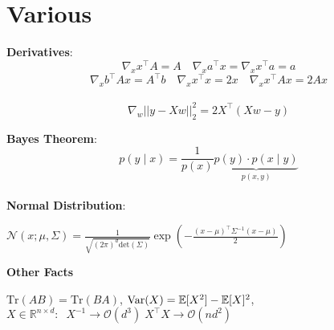 \section*{Various}

\textbf{Derivatives}:
$$\nabla_x x^\top A = A \quad \nabla_x a^\top x = \nabla_x x^\top a = a$$
$$\nabla_x b^\top A x = A^\top b \quad \nabla_x x^\top x = 2x \quad \nabla_x x^\top A x = 2 Ax$$\\[-20pt]
$$\nabla_w || y-Xw||_2^2 = 2X^\top(Xw-y)$$

\textbf{Bayes Theorem}: \\[-13pt]
$$p(y \; | \; x) = \frac{1}{p(x)} \underbrace{p(y) \cdot p(x \; | \; y)}_{p(x,y)}$$ \\[-23pt]

\textbf{Normal Distribution}:

$\mathcal{N}(x; \mu, \Sigma) = \frac{1}{\sqrt{(2 \pi)^d \text{det}(\Sigma)}} \exp(-\frac{(x - \mu)^\top \Sigma^{-1} (x-\mu)}{2})$

\textbf{Other Facts}

$\text{Tr}(AB) = \text{Tr}(BA)$, $\text{Var}(X) = \mathbb{E}[X^2] - \mathbb{E}[X]^2$, $X \in \mathbb{R}^{n \times d}: \; \; X^{-1} \rightarrow \mathcal{O}(d^3) \; X^\top X \rightarrow \mathcal{O}(nd^2)$